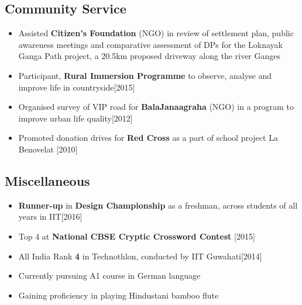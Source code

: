 \documentclass{article}
\begin{document}
\subsection*{\large Community Service}
\vspace{-4pt}
\begin{itemize}[itemsep = -0.7 mm, leftmargin=*]
	\item Assisted \textbf{Citizen's Foundation} (NGO) in review of settlement plan, public awareness meetings and comparative assessment of DPs for the Loknayak Ganga Path project, a 20.5km proposed driveway along the river Ganges
	\item Participant, \textbf{Rural Immersion Programme} to observe, analyse and improve life in countryside\hfill{[2015]}
	\item Organised survey of VIP road for \textbf{BalaJanaagraha} (NGO) in a program to improve urban life quality\hfill{[2012]}
	\item Promoted donation drives for \textbf{Red Cross} as a part of school project La Benovelat \hfill{[2010]}
\end{itemize}
\vspace{-15pt}
\subsection*{\large Miscellaneous}
\vspace{-4pt}
\begin{itemize}[itemsep = -0.7 mm, leftmargin=*]
	\item \textbf{Runner-up} in \textbf{Design Championship} as a freshman, across students of all years in IIT\hfill{[2016]}
	\item Top 4 at \textbf{National CBSE Cryptic Crossword Contest} \hfill{[2015]}
	\item All India Rank \textbf{4} in Technothlon, conducted by IIT Guwahati\hfill{[2014]}
	\item Currently pursuing A1 course in German language
	\item Gaining proficiency in playing Hindustani bamboo flute
\end{itemize}
\end{document}
